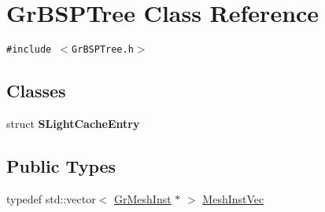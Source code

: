 \hypertarget{class_gr_b_s_p_tree}{
\section{GrBSPTree Class Reference}
\label{class_gr_b_s_p_tree}
}
{\tt \#include $<$GrBSPTree.h$>$}

\subsection*{Classes}
\begin{CompactItemize}
\item 
struct \textbf{SLightCacheEntry}
\end{CompactItemize}
\subsection*{Public Types}
\begin{CompactItemize}
\item 
typedef std::vector$<$ \hyperlink{class_gr_mesh_inst}{GrMeshInst} $\ast$ $>$ \hyperlink{class_gr_b_s_p_tree_17eda1992ed024630ab8ae114f7c78a3}{MeshInstVec}
\end{CompactItemize}
